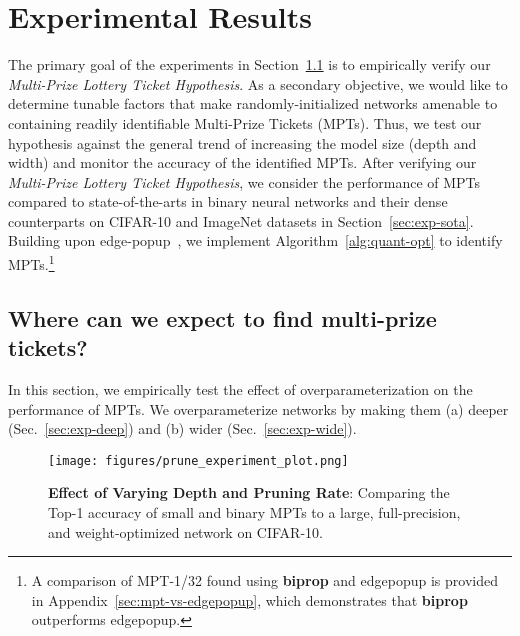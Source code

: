 \documentclass{article} \usepackage{iclr2021_conference,times}
\begin{document}
\iffalse

\fi

\section{Experimental Results}

The primary goal of the experiments in  Section~\ref{sec:exp-mplth} is to empirically verify our \textit{Multi-Prize Lottery Ticket Hypothesis}. As a secondary objective, we would like to determine tunable factors that make randomly-initialized networks amenable to containing readily identifiable Multi-Prize Tickets (MPTs). Thus, we test our hypothesis against the general trend of increasing the model size (depth and width) and monitor the accuracy of the identified MPTs. 
After verifying our \textit{Multi-Prize Lottery Ticket Hypothesis}, we consider the performance of MPTs compared to state-of-the-arts in binary neural networks and their dense counterparts on CIFAR-10 and ImageNet datasets in Section~\ref{sec:exp-sota}. 
Building upon {edge-popup}~\citep{ramanujan2019whats}, we implement Algorithm~\ref{alg:quant-opt} to identify MPTs.\footnote{A comparison of MPT-1/32 found using \textbf{biprop} and edgepopup is provided in Appendix~\ref{sec:mpt-vs-edgepopup}, which demonstrates that \textbf{biprop} outperforms edgepopup.}









\subsection{Where can we expect to find multi-prize tickets?} \label{sec:exp-mplth}



In this section, we empirically test the effect of overparameterization on the performance of MPTs. We overparameterize networks by making them (a) deeper (Sec.~\ref{sec:exp-deep}) and (b) wider (Sec.~\ref{sec:exp-wide}).  

\begin{figure}[h]
    \centering
    \texttt{[image: figures/prune\_experiment\_plot.png]}
    \caption{{\bfseries Effect of Varying Depth and Pruning Rate}: Comparing the Top-1 accuracy of small and binary MPTs to a large, full-precision, and weight-optimized network on CIFAR-10.}
    \label{fig:prune-plot}
\end{figure}
\end{document}
